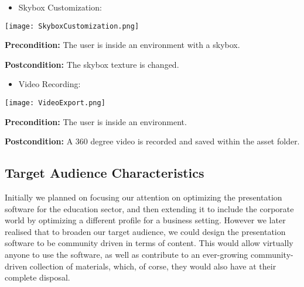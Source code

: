 \begin{flushleft}
	\begin{itemize}
		\item Skybox Customization:					
	\end{itemize}
	
	\begin{center}
	\texttt{[image: SkyboxCustomization.png]}
	\end{center}
	
	\textbf{Precondition:} The user is inside an environment with a skybox.
	
	\textbf{Postcondition:} The skybox texture is changed.
	
	\begin{itemize}
		\item Video Recording:					
	\end{itemize}
	
	\begin{center}
	\texttt{[image: VideoExport.png]}
	\end{center}
	
	\textbf{Precondition:} The user is inside an environment.
	
	\textbf{Postcondition:} A 360 degree video is recorded and saved within the asset folder.
	\end{flushleft}

\subsection{Target Audience Characteristics}

	Initially we planned on focusing our attention on optimizing the presentation software for the education sector, and then extending it to include the corporate world by optimizing a different profile for a business setting.  However we later realised that to broaden our target audience, we could design the presentation software to be community driven in terms of content.  This would allow virtually anyone to use the software, as well as contribute to an ever-growing community-driven collection of materials, which, of corse, they would also have at their complete disposal.

